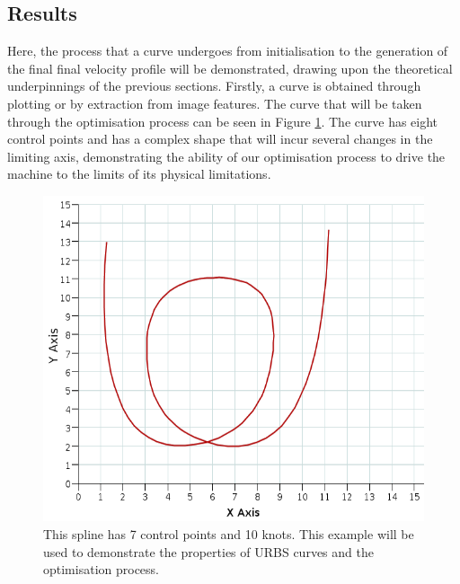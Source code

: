 \subsection{Results}
Here, the process that a curve undergoes from initialisation to the generation of the final final velocity profile will be demonstrated, drawing upon the theoretical underpinnings of the previous sections.
Firstly, a curve is obtained through plotting or by extraction from image features. The curve that will be taken through the optimisation process can be seen in Figure \ref{fig:example}. The curve has eight control points and has a complex shape that will incur several changes in the limiting axis, demonstrating the ability of our optimisation process to drive the machine to the limits of its physical limitations.

\begin{figure}  
\includegraphics[width=\textwidth]{figures/optimisation/exampleSpline.png}
\caption[Optimisation example curve]{ This spline has 7 control points and 10 knots. This example will be used to demonstrate the properties of URBS curves and the optimisation process.
\label{fig:example}}
\end{figure}

